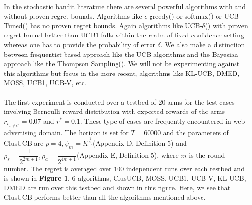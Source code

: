 \paragraph{}In the stochastic bandit literature there are several powerful algorithms with and without proven regret bounds. Algorithms like $\epsilon$-greedy(\cite{sutton1998reinforcement}) or softmax(\cite{sutton1998reinforcement}) or UCB-Tuned(\cite{auer2002finite}) has no proven regret bounds. Again algorithms like UCB-$\delta$(\cite{abbasi2011improved}) with proven regret bound better than UCB1  falls within the realm of fixed confidence setting whereas one has to provide the probability of error $\delta$. We also make a distinction between frequentist based approach like the UCB algorithms and the Bayesian approach like the Thompson Sampling(\cite{agrawal2011analysis}). We will not be experimenting against this algorithms but focus in the more recent, algorithms like KL-UCB, DMED, MOSS, UCB1, UCB-V, etc. 

\paragraph{}The first experiment is conducted over a testbed of $20$ arms for the test-cases involving Bernoulli reward distribution with expected rewards of the arms $r_{i_{a_{i}\neq a^{*}}}=0.07$ and $r^{*}=0.1$. These type of cases are frequently encountered in web-advertising domain. The horizon is set for $T=60000$ and the parameters of ClusUCB are $p=4,\psi_{m}=K^{\frac{1}{\rho_{s}}}$(Appendix D, Definition 5) and $\rho_{s}=\dfrac{1}{2^{2m+1}},\rho_{a}=\dfrac{1}{2^{4m+1}}$(Appendix E, Definition 5), where $m$ is the round number. The regret is averaged over $100$ independent runs over each testbed and is shown in \textbf{Figure 1}. $6$ algorithms, ClusUCB, MOSS, UCB1, UCB-V, KL-UCB, DMED are run over this testbed and shown in this figure. Here, we see that ClusUCB performs better than all the algorithms mentioned above.


